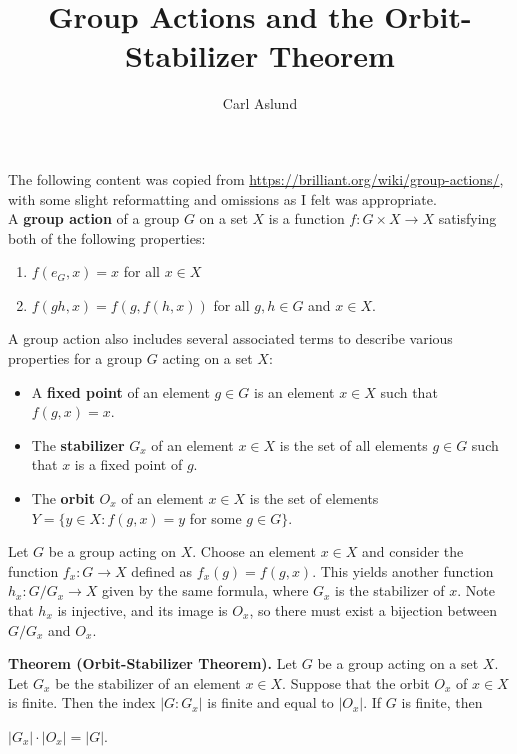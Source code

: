 \documentclass[ebook,12pt,oneside,openany]{article}
\title{Group Actions and the Orbit-Stabilizer Theorem}
\author{Carl Aslund}
\begin{document}
	\maketitle
	
	\noindent The following content was copied from \url{https://brilliant.org/wiki/group-actions/}, with some slight reformatting and omissions as I felt was appropriate.\\
	
	A \textbf{group action} of a group $G$ on a set $X$ is a function $f:G \times X \rightarrow X$ satisfying both of the following properties:
	
	\begin{enumerate}
		\item $f(e_G, x)=x$ for all $x \in X$
		\item $f(gh, x)=f(g,f(h,x))$ for all $g,h \in G$ and $x \in X$.
	\end{enumerate}
	
	A group action also includes several associated terms to describe various properties for a group $G$ acting on a set $X$:
	
	\begin{itemize}
		\item A \textbf{fixed point} of an element $g \in G$ is an element $x \in X$ such that $f(g,x)=x$.
		\item The \textbf{stabilizer} $G_x$ of an element $x \in X$ is the set of all elements $g \in G$ such that $x$ is a fixed point of $g$.
		\item The \textbf{orbit} $O_x$ of an element $x \in X$ is the set of elements $Y=\{y \in X : f(g,x)=y$ for some $g \in G\}$.
	\end{itemize}

	Let $G$ be a group acting on $X$. Choose an element $x \in X$ and consider the function $f_x : G \rightarrow X$ defined as $f_x(g)=f(g,x)$. This yields another function $h_x:G/G_x \rightarrow X$ given by the same formula, where $G_x$ is the stabilizer of $x$. Note that $h_x$ is injective, and its image is $O_x$, so there must exist a bijection between $G/G_x$ and $O_x$.
	
	\textbf{Theorem (Orbit-Stabilizer Theorem).} Let $G$ be a group acting on a set $X$. Let $G_x$ be the stabilizer of an element $x \in X$. Suppose that the orbit $O_x$ of $x \in X$ is finite. Then the index $|G:G_x|$ is finite and equal to $|O_x|$.  If $G$ is finite, then
	\begin{center}
		$|G_x| \cdot |O_x| = |G|$.
	\end{center}
	
\end{document}
